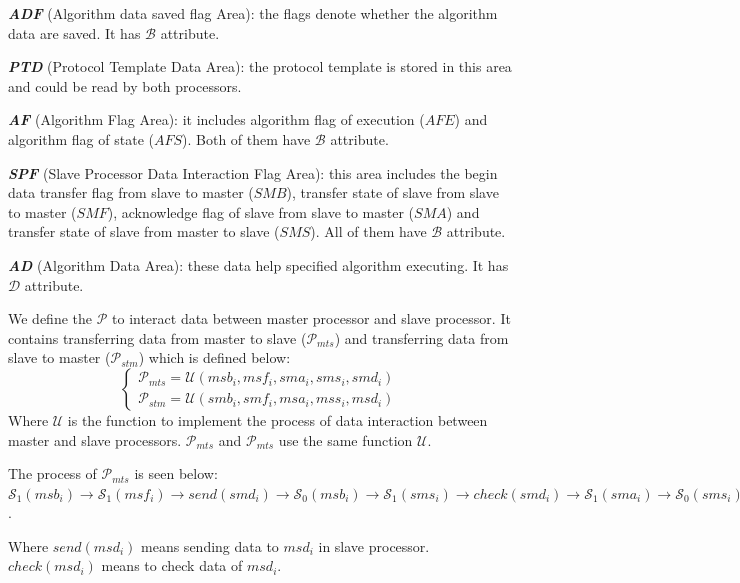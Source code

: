 \documentclass[journal,UTF8]{IEEEtran}
\begin{document}
\textbf{\emph{ADF}} (Algorithm data saved flag Area): the flags denote whether the algorithm data are saved. It has $\mathcal{B}$ attribute.

\textbf{\emph{PTD}} (Protocol Template Data Area): the protocol template is stored in this area and could be read by both processors.


\textbf{\emph{AF}} (Algorithm Flag Area): it includes algorithm flag of execution ($AFE$) and algorithm flag of state ($AFS$).
Both of them have $\mathcal{B}$ attribute.

\textbf{\emph{SPF}} (Slave Processor Data Interaction Flag Area): this area includes the begin data transfer flag from slave to master ($SMB$), transfer state of slave from slave to master ($SMF$), acknowledge flag of slave from slave to master ($SMA$) and transfer state of slave from master to slave ($SMS$). All of them have $\mathcal{B}$ attribute.

\textbf{\emph{AD}} (Algorithm Data Area): these data help specified algorithm executing. It has $\mathcal{D}$ attribute.
 
 We define the $\mathcal{P}$ to interact data between master processor and slave processor. It contains transferring data from master to slave ($\mathcal{P}_{mts}$) and transferring data from slave to master ($\mathcal{P}_{stm}$) which is defined below:
 \begin{equation}
 \left\{
 \begin{array}{l}
 \mathcal{P}_{mts} = \mathcal{U} (msb_i,msf_i,sma_i,sms_i,smd_i)\\
 \mathcal{P}_{stm} = \mathcal{U} (smb_i,smf_i,msa_i,mss_i,msd_i)
 \end{array}
 \right.
 \end{equation}
 Where $\mathcal{U}$ is the function to implement the process of data interaction between master and slave processors. $\mathcal{P}_{mts}$ and $\mathcal{P}_{mts}$ use the same function $\mathcal{U}$.
 
 The process of $\mathcal{P}_{mts}$ is seen below:
 	$\mathcal{S}_1(msb_i)\to\mathcal{S}_1(msf_i)\to send(smd_i)\to\mathcal{S}_0(msb_i)\to\mathcal{S}_1(sms_i)\to check(smd_i)\to\mathcal{S}_1(sma_i)\to\mathcal{S}_0(sms_i)\to\mathcal{S}_0(sma_i)\to\mathcal{S}_0(msf_i)$.
 
 Where $send(msd_i)$ means sending data to $msd_i$ in slave processor. $check(msd_i)$ means to check data of $msd_i$.

 

\end{document}
